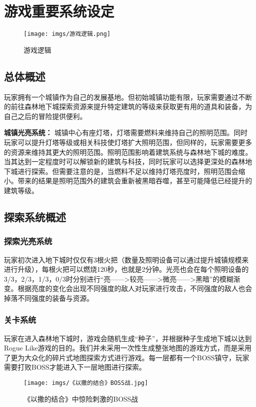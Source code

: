 \section{游戏重要系统设定}

\begin{figure}[ht]
    \centering
    \texttt{[image: imgs/游戏逻辑.png]}
    \caption{游戏逻辑}
\end{figure}


\subsection{总体概述}
玩家拥有一个城镇作为自己的发展基地。但初始城镇功能有限，玩家需要通过不断的前往森林地下城探索资源来提升特定建筑的等级来获取更有用的道具和装备，为自己之后的冒险提供便利。

\textbf{城镇光亮系统：}
城镇中心有座灯塔，灯塔需要燃料来维持自己的照明范围。同时玩家可以提升灯塔等级或相关科技使灯塔扩大照明范围，但同样的，玩家需要更多的资源来维持其更大的照明范围。照明范围影响着建筑系统与森林地下城的难度。当其达到一定程度时可以解锁新的建筑与科技，同时玩家可以选择更深处的森林地下城进行探索。但需要注意的是，当燃料不足以维持灯塔亮度时，照明范围会缩小。带来的结果是照明范围外的建筑会重新被黑暗吞噬，甚至可能降低已经提升的建筑等级。

\subsection{探索系统概述}

\subsubsection{探索光亮系统}
玩家初次进入地下城时仅仅有3根火把（数量及照明设备可以通过提升城镇规模来进行升级），每根火把可以燃烧120秒，也就是2分钟。光亮也会在每个照明设备的3/3，2/3，1/3，0/3时分别进行“亮——>较亮——>微亮——>黑暗”的模糊渐变。根据亮度的变化会出现不同强度的敌人对玩家进行攻击，不同强度的敌人也会掉落不同强度的装备与资源。

\subsubsection{关卡系统}
玩家在进入森林地下城时，游戏会随机生成“种子”，并根据种子生成地下城以达到Rogue Like游戏的目的。我们并未采用一次性生成整张地图的游戏方式，而是采用了更为大众化的碎片式地图探索方式进行游戏。每一层都有一个BOSS镇守，玩家需要打败BOSS才能进入下一层地图进行探索。

\begin{figure}[ht]
    \centering
    \texttt{[image: imgs/《以撒的结合》BOSS战.jpg]}
    \caption{《以撒的结合》中惊险刺激的BOSS战}
\end{figure}


